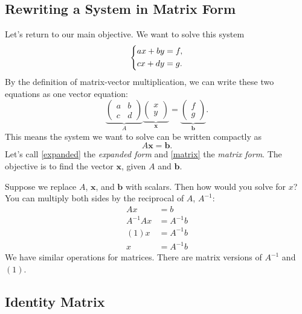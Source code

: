 \documentclass[10pt,letterpaper]{article}
\begin{document}
\subsection{Rewriting a System in Matrix Form}

Let's return to our main objective. We want to solve this system
\begin{equation}    
\begin{dcases}
ax+by=f,\\
cx+dy=g.
\end{dcases}\label{expanded}
\end{equation}
By the definition of matrix-vector multiplication,
we can write these two equations as one vector equation:
\[
\underbrace{
\begin{pmatrix}
a&b\\
c&d
\end{pmatrix}}_{A}
\underbrace{
\begin{pmatrix}x\\y\end{pmatrix}}_{\mathbf{x}}
=
\underbrace{
\begin{pmatrix}f\\g\end{pmatrix}}_{\mathbf{b}}.
\]
This means the system we want to solve can be written compactly as
\begin{equation}\label{matrix}
A\mathbf{x}=\mathbf{b}.
\end{equation}
Let's call \eqref{expanded} the \textit{expanded form} and \eqref{matrix} the \textit{matrix form}. The objective is to find the vector $\textbf{x}$, given $A$ and $\textbf{b}$.

Suppose we replace $A$, $\textbf{x}$, and $\textbf{b}$ with scalars. Then how would you solve for $x$? You can multiply both sides by the reciprocal of $A$, $A^{-1}$: 
\begin{align*}
    Ax&=b\\
    A^{-1}Ax&=A^{-1}b\\
    (1)x&=A^{-1}b\\
    x &= A^{-1}b
\end{align*}
We have similar operations for matrices. There are matrix versions of $A^{-1}$ and $(1)$.

\subsection{Identity Matrix}
\end{document}
